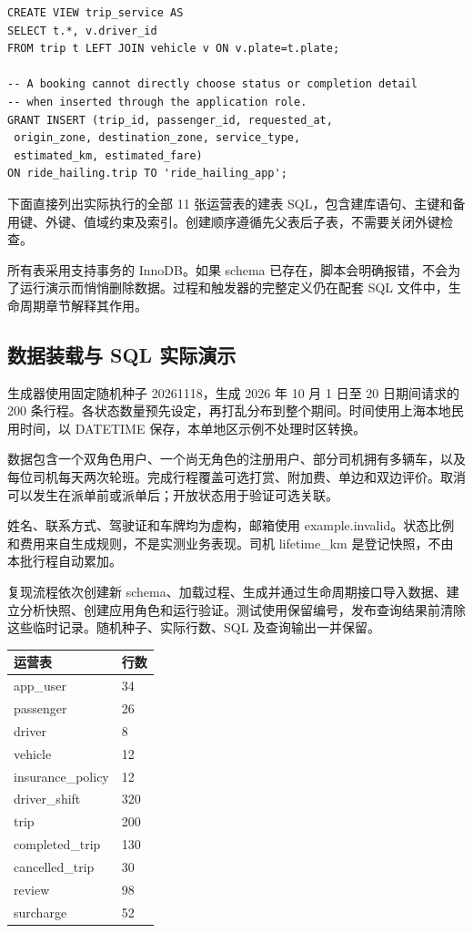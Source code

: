 \documentclass[11pt,a4paper]{article}
\begin{document}
\begin{lstlisting}
CREATE VIEW trip_service AS
SELECT t.*, v.driver_id
FROM trip t LEFT JOIN vehicle v ON v.plate=t.plate;

-- A booking cannot directly choose status or completion detail
-- when inserted through the application role.
GRANT INSERT (trip_id, passenger_id, requested_at,
 origin_zone, destination_zone, service_type,
 estimated_km, estimated_fare)
ON ride_hailing.trip TO 'ride_hailing_app';
\end{lstlisting}

下面直接列出实际执行的全部 11 张运营表的建表 SQL，包含建库语句、主键和备用键、外键、值域约束及索引。创建顺序遵循先父表后子表，不需要关闭外键检查。

所有表采用支持事务的 InnoDB。如果 schema 已存在，脚本会明确报错，不会为了运行演示而悄悄删除数据。过程和触发器的完整定义仍在配套 SQL 文件中，生命周期章节解释其作用。


\subsection{数据装载与 SQL 实际演示}
生成器使用固定随机种子 20261118，生成 2026 年 10 月 1 日至 20 日期间请求的 200 条行程。各状态数量预先设定，再打乱分布到整个期间。时间使用上海本地民用时间，以 DATETIME 保存，本单地区示例不处理时区转换。

数据包含一个双角色用户、一个尚无角色的注册用户、部分司机拥有多辆车，以及每位司机每天两次轮班。完成行程覆盖可选打赏、附加费、单边和双边评价。取消可以发生在派单前或派单后；开放状态用于验证可选关联。

姓名、联系方式、驾驶证和车牌均为虚构，邮箱使用 example.invalid。状态比例和费用来自生成规则，不是实测业务表现。司机 lifetime\_\allowbreak{}km 是登记快照，不由本批行程自动累加。

复现流程依次创建新 schema、加载过程、生成并通过生命周期接口导入数据、建立分析快照、创建应用角色和运行验证。测试使用保留编号，发布查询结果前清除这些临时记录。随机种子、实际行数、SQL 及查询输出一并保留。

\par\begingroup\small\noindent
\begin{tabularx}{\linewidth}{YY}
\toprule
运营表 & 行数\\\midrule
app\_\allowbreak{}user & 34\\
passenger & 26\\
driver & 8\\
vehicle & 12\\
insurance\_\allowbreak{}policy & 12\\
driver\_\allowbreak{}shift & 320\\
trip & 200\\
completed\_\allowbreak{}trip & 130\\
cancelled\_\allowbreak{}trip & 30\\
review & 98\\
surcharge & 52\\
\bottomrule
\end{tabularx}
\par\endgroup
\end{document}
